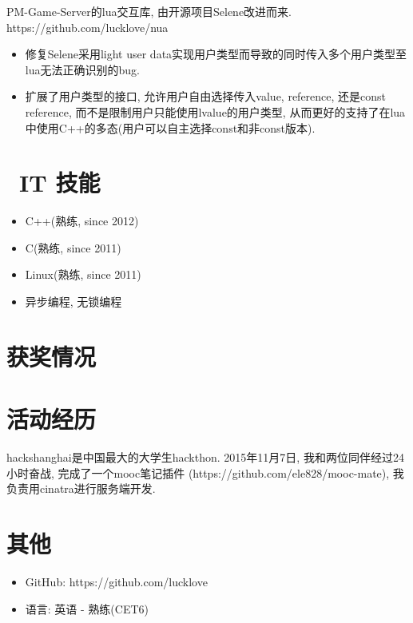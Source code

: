 \documentclass{resume}
\begin{document}
\begin{multicols}{2}
\begin{onehalfspacing}
PM-Game-Server的lua交互库, 由开源项目Selene改进而来.
\newline
https://github.com/lucklove/nua
\begin{itemize}
  \item 修复Selene采用light user data实现用户类型而导致的同时传入多个用户类型至lua无法正确识别的bug.
  \item 扩展了用户类型的接口, 允许用户自由选择传入value, reference, 还是const reference, 而不是限制用户只能使用lvalue的用户类型, 从而更好的支持了在lua中使用C++的多态(用户可以自主选择const和非const版本).
\end{itemize}
\end{onehalfspacing}



\section{\faCogs\ IT 技能}
\begin{itemize}[parsep=0.5ex]
  \item C++(熟练, since 2012)
  \item C(熟练, since 2011)
  \item Linux(熟练, since 2011)
  \item 异步编程, 无锁编程
\end{itemize}

\section{\faHeartO 获奖情况}

\section{\faUsers 活动经历}
hackshanghai是中国最大的大学生hackthon. 
2015年11月7日, 我和两位同伴经过24小时奋战, 
完成了一个mooc笔记插件
(https://github.com/ele828/mooc-mate),
我负责用cinatra进行服务端开发. 

\section{\faInfo 其他}
\begin{itemize}[parsep=0.5ex]
  \item GitHub: https://github.com/lucklove
  \item 语言: 英语 - 熟练(CET6)
\end{itemize}

\end{multicols} %

%
%
\end{document}
